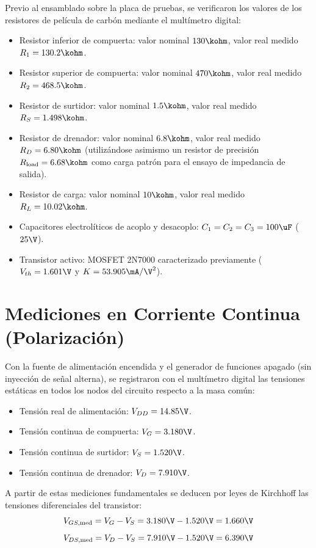 Previo al ensamblado sobre la placa de pruebas, se verificaron los valores de los resistores de película de carbón
mediante el multímetro digital:
\begin{itemize}
  \item Resistor inferior de compuerta: valor nominal $130\kohm$, valor real medido $R_1 = 130.2\kohm$.
  \item Resistor superior de compuerta: valor nominal $470\kohm$, valor real medido $R_2 = 468.5\kohm$.
  \item Resistor de surtidor: valor nominal $1.5\kohm$, valor real medido $R_S = 1.498\kohm$.
  \item Resistor de drenador: valor nominal $6.8\kohm$, valor real medido $R_D = 6.80\kohm$ (utilizándose asimismo un
    resistor de precisión $R_{\mathrm{load}} = 6.68\kohm$ como carga patrón para el ensayo de impedancia de salida).
  \item Resistor de carga: valor nominal $10\kohm$, valor real medido $R_L = 10.02\kohm$.
  \item Capacitores electrolíticos de acoplo y desacoplo: $C_1 = C_2 = C_3 = 100\uF$ ($25\V$).
  \item Transistor activo: MOSFET 2N7000 caracterizado previamente ($V_{th} = 1.601\V$ y $K = 53.905\mA/\V^2$).
\end{itemize}

\section{Mediciones en Corriente Continua (Polarización)}

Con la fuente de alimentación encendida y el generador de funciones apagado (sin inyección de señal alterna), se
registraron con el multímetro digital las tensiones estáticas en todos los nodos del circuito respecto a la masa común:
\begin{itemize}
  \item Tensión real de alimentación: $V_{DD} = 14.85\V$.
  \item Tensión continua de compuerta: $V_G = 3.180\V$.
  \item Tensión continua de surtidor: $V_S = 1.520\V$.
  \item Tensión continua de drenador: $V_D = 7.910\V$.
\end{itemize}

A partir de estas mediciones fundamentales se deducen por leyes de Kirchhoff las tensiones diferenciales del transistor:
\begin{equation}
  V_{GS,\mathrm{med}} = V_G - V_S = 3.180\V - 1.520\V = 1.660\V
  \label{eq:VGS_medida}
\end{equation}
\begin{equation}
  V_{DS,\mathrm{med}} = V_D - V_S = 7.910\V - 1.520\V = 6.390\V
  \label{eq:VDS_medida}
\end{equation}

